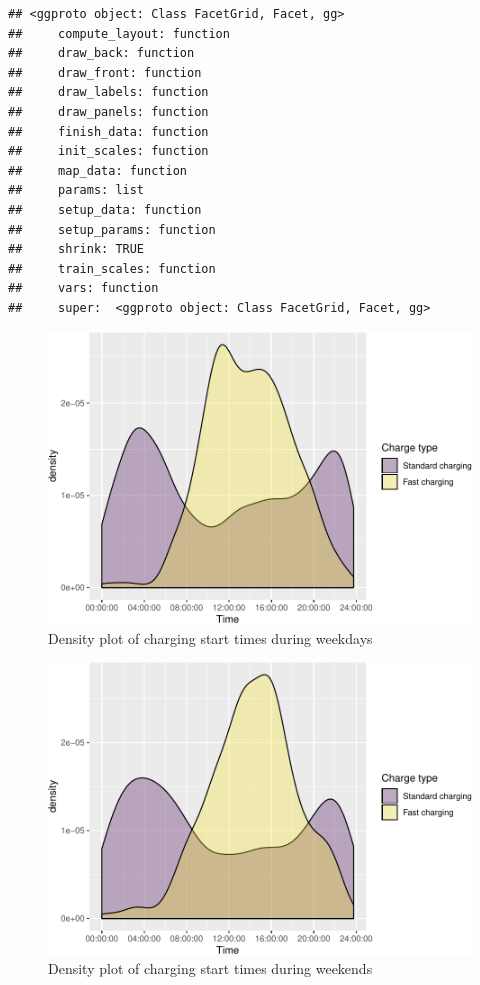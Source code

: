 \documentclass[]{article}
\begin{document}
\begin{verbatim}
## <ggproto object: Class FacetGrid, Facet, gg>
##     compute_layout: function
##     draw_back: function
##     draw_front: function
##     draw_labels: function
##     draw_panels: function
##     finish_data: function
##     init_scales: function
##     map_data: function
##     params: list
##     setup_data: function
##     setup_params: function
##     shrink: TRUE
##     train_scales: function
##     vars: function
##     super:  <ggproto object: Class FacetGrid, Facet, gg>
\end{verbatim}

\begin{figure}
\centering
\includegraphics{EVBB_report_files/figure-latex/chargeBeginsWeekday-1.pdf}
\caption{\label{fig:chargeBeginsWeekday}Density plot of charging start times
during weekdays}
\end{figure}

\begin{figure}
\centering
\includegraphics{EVBB_report_files/figure-latex/chargeBeginsWeekend-1.pdf}
\caption{\label{fig:chargeBeginsWeekend}Density plot of charging start times
during weekends}
\end{figure}
\end{document}

